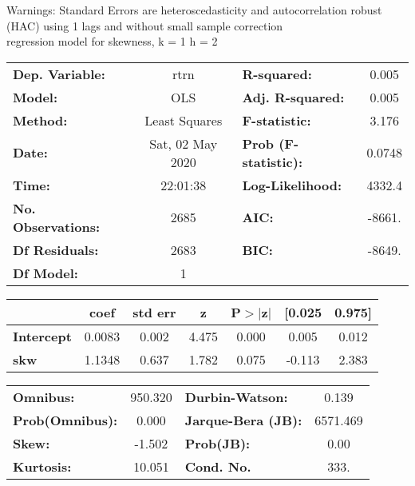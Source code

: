 Warnings: \newline
 [1] Standard Errors are heteroscedasticity and autocorrelation robust (HAC) using 1 lags and without small sample correction\\ 

regression model for skewness, k = 1 h = 2\begin{center}
\begin{tabular}{lclc}
\toprule
\textbf{Dep. Variable:}    &       rtrn       & \textbf{  R-squared:         } &     0.005   \\
\textbf{Model:}            &       OLS        & \textbf{  Adj. R-squared:    } &     0.005   \\
\textbf{Method:}           &  Least Squares   & \textbf{  F-statistic:       } &     3.176   \\
\textbf{Date:}             & Sat, 02 May 2020 & \textbf{  Prob (F-statistic):} &   0.0748    \\
\textbf{Time:}             &     22:01:38     & \textbf{  Log-Likelihood:    } &    4332.4   \\
\textbf{No. Observations:} &        2685      & \textbf{  AIC:               } &    -8661.   \\
\textbf{Df Residuals:}     &        2683      & \textbf{  BIC:               } &    -8649.   \\
\textbf{Df Model:}         &           1      & \textbf{                     } &             \\
\bottomrule
\end{tabular}
\begin{tabular}{lcccccc}
                   & \textbf{coef} & \textbf{std err} & \textbf{z} & \textbf{P$> |$z$|$} & \textbf{[0.025} & \textbf{0.975]}  \\
\midrule
\textbf{Intercept} &       0.0083  &        0.002     &     4.475  &         0.000        &        0.005    &        0.012     \\
\textbf{skw}       &       1.1348  &        0.637     &     1.782  &         0.075        &       -0.113    &        2.383     \\
\bottomrule
\end{tabular}
\begin{tabular}{lclc}
\textbf{Omnibus:}       & 950.320 & \textbf{  Durbin-Watson:     } &    0.139  \\
\textbf{Prob(Omnibus):} &   0.000 & \textbf{  Jarque-Bera (JB):  } & 6571.469  \\
\textbf{Skew:}          &  -1.502 & \textbf{  Prob(JB):          } &     0.00  \\
\textbf{Kurtosis:}      &  10.051 & \textbf{  Cond. No.          } &     333.  \\
\bottomrule
\end{tabular}
\end{center}

